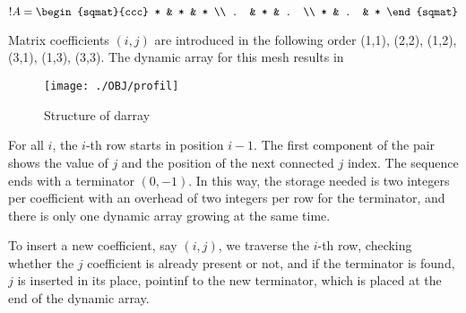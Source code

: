 
\begin{equation} 
  !A = 
\begin{sqmat}{ccc}
      * & * & * \\    
      . & * & . \\    
      * & . & * 
\end{sqmat} 
\end{equation}

Matrix coefficients $(i,j)$ are introduced in the following order (1,1),
(2,2), (1,2), (3,1), (1,3), (3,3).  The dynamic array for this mesh
results in

\begin{figure*}[ht]
\centerline{\texttt{[image: ./OBJ/profil]}}
\caption{Structure of darray}
\label{fg:profil}
\end{figure*}

For all $i$, the $i$-th row starts in position $i-1$. The first
component of the pair shows the value of $j$ and the position of the
next connected $j$ index. The sequence ends with a terminator
$(0,-1)$. In this way, the storage needed is two integers per
coefficient with an overhead of two integers per row for the
terminator, and there is only one dynamic array growing at the same
time. 

To insert a new coefficient, say $(i,j)$, we traverse the $i$-th row,
checking whether the $j$ coefficient is already present or not, and if
the terminator is found, $j$ is inserted in its place, pointinf to the
new terminator, which is placed at the end of the dynamic array.

